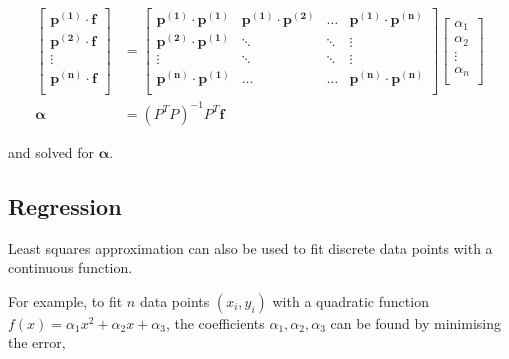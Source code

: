\documentclass[12pt]{article}
\begin{document}
\begin{align*}
\begin{bmatrix}
	\mathbf{p^{(1)}} \cdot \mathbf{f} \\[1ex]
	\mathbf{p^{(2)}} \cdot \mathbf{f} \\[1ex]
	\vdots \\[1ex]
	\mathbf{p^{(n)}} \cdot \mathbf{f} \\[1ex]
\end{bmatrix} 
&=
\begin{bmatrix}
  	\mathbf{p^{(1)}} \cdot \mathbf{p^{(1)}} & \mathbf{p^{(1)}} \cdot \mathbf{p^{(2)}} & \dots & \mathbf{p^{(1)}} \cdot \mathbf{p^{(n)}} \\[1ex]
    \mathbf{p^{(2)}} \cdot \mathbf{p^{(1)}} & \ddots & \ddots & \vdots \\[1ex]
    \vdots & \ddots & \ddots & \vdots \\[1ex]
    \mathbf{p^{(n)}} \cdot \mathbf{p^{(1)}} & \dots & \dots & \mathbf{p^{(n)}} \cdot \mathbf{p^{(n)}} \\
\end{bmatrix}
\begin{bmatrix}
	\alpha_1 \\[1ex]
	\alpha_2 \\[1ex]
	\vdots \\[1ex]
	\alpha_n \\[1ex]
\end{bmatrix} 
 \\[2ex]
\boldsymbol{\alpha} &= (P^TP)^{-1}P^T\mathbf{f}
\end{align*}

\vspace{5mm}

and solved for $\boldsymbol{\alpha}$.

\newpage

\subsection{Regression}

\vspace{4mm}

Least squares approximation can also be used to fit discrete data points with a continuous function.

\vspace{5mm}

For example, to fit $n$ data points $(x_i,y_i)$ with a quadratic function $f(x)=\alpha_1 x^2 + \alpha_2 x + \alpha_3$, the coefficients $\alpha_1, \alpha_2, \alpha_3$ can be found by minimising the error,
\end{document}

